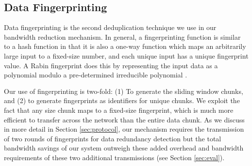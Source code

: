 \subsection{Data Fingerprinting}
\label{sec:fingerprinting}
Data fingerprinting is the second deduplication technique we use in our bandwidth reduction mechanism. In general, a fingerprinting function is similar to a hash function in that it is also a one-way function which maps an arbitrarily large input to a fixed-size number, and each unique input has a unique fingerprint value. A Rabin fingerprint does this by representing the input data as a polynomial modulo a pre-determined irreducible polynomial \cite{rabin,lbfs}.

Our use of fingerprinting is two-fold: (1) To generate the sliding window chunks, and (2) to generate fingerprints as identifiers for unique chunks. We exploit the fact that any size chunk maps to a fixed-size fingerprint, which is much more efficient to transfer across the network than the entire data chunk. As we discuss in more detail in Section \ref{sec:protocol}, our mechanism requires the transmission of two rounds of fingerprints for data redundancy detection but the total bandwidth savings of our system outweigh these added overhead and bandwidth requirements of these two additional transmissions (see Section \ref{sec:eval}).